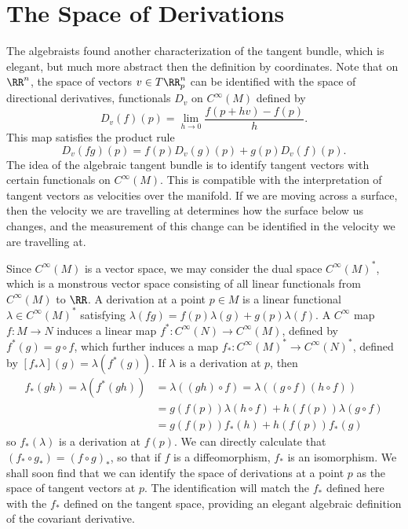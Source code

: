 %
%

\section{The Space of Derivations}

The algebraists found another characterization of the tangent bundle, which is elegant, but much more abstract then the definition by coordinates. Note that on $\RR^n$, the space of vectors $v \in T\RR^n_p$ can be identified with the space of directional derivatives, functionals $D_v$ on $C^\infty(M)$ defined by
%
\[ D_v(f)(p) = \lim_{h \to 0} \frac{f(p + hv) - f(p)}{h}. \]
%
This map satisfies the product rule
%
\[ D_v(fg)(p) = f(p) D_v(g)(p) + g(p) D_v(f)(p). \]
%
The idea of the algebraic tangent bundle is to identify tangent vectors with certain functionals on $C^\infty(M)$. This is compatible with the interpretation of tangent vectors as velocities over the manifold. If we are moving across a surface, then the velocity we are travelling at determines how the surface below us changes, and the measurement of this change can be identified in the velocity we are travelling at.

Since $C^\infty(M)$ is a vector space, we may consider the dual space $C^\infty(M)^*$, which is a monstrous vector space consisting of all linear functionals from $C^\infty(M)$ to $\RR$. A derivation at a point $p \in M$ is a linear functional $\lambda \in C^\infty(M)^*$ satisfying $\lambda(fg) = f(p) \lambda(g) + g(p) \lambda(f)$. A $C^\infty$ map $f: M \to N$ induces a linear map $f^*: C^\infty(N) \to C^\infty(M)$, defined by $f^*(g) = g \circ f$, which further induces a map $f_*: C^\infty(M)^* \to C^\infty(N)^*$, defined by $[f_*\lambda](g) = \lambda(f^*(g))$. If $\lambda$ is a derivation at $p$, then
%
\begin{align*}
    f_*(gh) = \lambda(f^*(gh)) &= \lambda((gh) \circ f) = \lambda((g \circ f)(h \circ f))\\
    &= g(f(p)) \lambda(h \circ f) + h(f(p)) \lambda(g \circ f)\\
    &= g(f(p)) f_*(h) + h(f(p)) f_*(g)
\end{align*}
%
so $f_*(\lambda)$ is a derivation at $f(p)$. We can directly calculate that $(f_* \circ g_*) = (f \circ g)_*$, so that if $f$ is a diffeomorphism, $f_*$ is an isomorphism. We shall soon find that we can identify the space of derivations at a point $p$ as the space of tangent vectors at $p$. The identification will match the $f_*$ defined here with the $f_*$ defined on the tangent space, providing an elegant algebraic definition of the covariant derivative.

